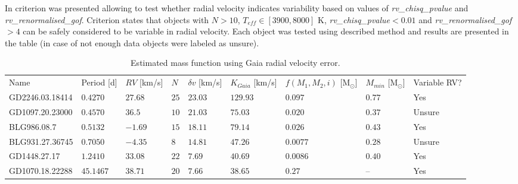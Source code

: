 \documentclass{pracalicmgr}
\begin{document}
In \citep{katz_gaia_2022} criterion was presented allowing to test whether radial velocity indicates variability based on values of {\it{rv\_chisq\_pvalue}}
and {\it{rv\_renormalised\_gof}}. Criterion states that objects with $N>10$, $T_{eff}\in [3900,8000]$ K, {\it{rv\_chisq\_pvalue}}$<0.01$ 
and {\it{rv\_renormalised\_gof}}$>4$ can be safely considered to be variable in radial velocity. Each object was tested using described method 
and results are presented in the table (in case of not enough data objects were labeled as unsure).
\begin{table}[H]
    \footnotesize
    \centering
    \setlength{\tabcolsep}{3pt}
    \begin{center}
    \begin{tabular}{lllllllll}
    Name & Period [d]& $RV$ [km/s]& $N$  &  $\delta v$  [km/s]   & $K_{Gaia}$ [km/s]  & $f(M_1,M_2,i)$ [M$_{\odot}$]& $M_{min}$ [M$_{\odot}$]&Variable RV?\\
    GD2246.03.18414 & $0.4270$ & $27.68$ & $25$ & $23.03$ & $129.93$ & $0.097$  & $0.77$ & Yes\\
    GD1097.20.23000 & $0.4570$ & $36.5$  & $10$ & $21.03$ & $75.03$  & $0.020$  & $0.37$& Unsure\\
    BLG986.08.7     & $0.5132$  & $-1.69$ & $15$ & $18.11$ & $79.14$   & $0.026$  & $0.43$& Yes\\
    BLG931.27.36745 & $0.7050$   & $-4.35$ & $8$  & $14.81$ & $47.26$  & $0.0077$ & $0.28$& Unsure\\
    GD1448.27.17    & $1.2410$  & $33.08$ & $22$ & $7.69$  & $40.69$  & $0.0086$ & $0.40$& Yes\\
    GD1070.18.22288 & $45.1467$  & $38.71$ & $20$ & $7.66$  & $38.65$  & $0.27$  & -- & Yes\\
    \end{tabular}
    \end{center}
    
    \caption{Estimated mass function using Gaia radial velocity error.}\label{mass_function_table}
\end{table}
\end{document}
